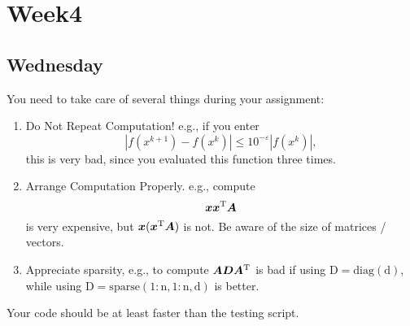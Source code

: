 
\chapter{Week4}

\section{Wednesday}
You need to take care of several things during your assignment:
\begin{enumerate}
\item
Do Not Repeat Computation! e.g., if you enter
\[
|f(x^{k+1}) - f(x^k)|\le 10^{-\varepsilon}|f(x^k)|,
\]
this is very bad, since you evaluated this function three times.
\item
Arrange Computation Properly. e.g., compute
\[
\bm x\bm x^{\mathrm T}\bm A
\]
is very expensive, but $\bm x(\bm x^{\mathrm T}\bm A)$ is not. Be aware of the size of matrices / vectors.
\item
Appreciate sparsity, e.g., to compute $\bm A\bm D\bm A^{\mathrm T}$ is bad if using $\mathrm{D = diag(d)}$, while using $\mathrm{D = sparse(1:n,1:n,d)}$ is better.
\end{enumerate}
Your code should be at least faster than the testing script.

